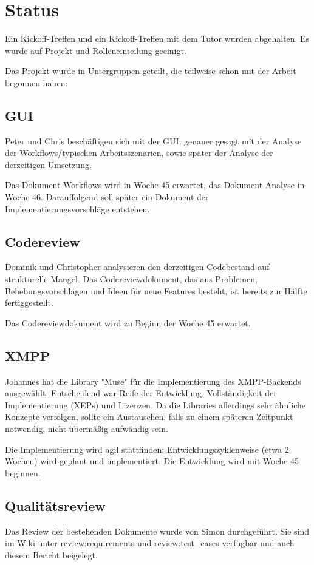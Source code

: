 \setcounter{chapter}{1}
\section{Status}
Ein Kickoff-Treffen und ein Kickoff-Treffen mit dem Tutor wurden abgehalten.
Es wurde auf Projekt und Rolleneinteilung geeinigt.

Das Projekt wurde in Untergruppen geteilt, die teilweise schon mit der Arbeit
begonnen haben:

\subsection{GUI}
Peter und Chris beschäftigen sich mit der GUI, genauer gesagt mit der Analyse
der Workflows/typischen Arbeitsszenarien, sowie später der Analyse der
derzeitigen Umsetzung.

Das Dokument Workflows wird in Woche 45 erwartet, das Dokument Analyse in
Woche 46. Darauffolgend soll später ein Dokument der Implementierungsvorschläge
 entstehen.

\subsection{Codereview}
Dominik und Christopher analysieren den derzeitigen Codebestand auf
strukturelle Mängel. Das Codereviewdokument, das aus Problemen,
Behebungsvorschlägen und Ideen für neue Features besteht, ist bereits zur Hälfte
fertiggestellt.

Das Codereviewdokument wird zu Beginn der Woche 45 erwartet.

\subsection{XMPP}
Johannes hat die Library "Muse" für die Implementierung des XMPP-Backends
ausgewählt. Entscheidend war Reife der Entwicklung, Vollständigkeit der
Implementierung (XEPs) und Lizenzen. Da die Libraries allerdings sehr ähnliche
Konzepte verfolgen, sollte ein Austauschen, falls zu einem späteren Zeitpunkt
notwendig, nicht übermäßig aufwändig sein.

Die Implementierung wird agil stattfinden: Entwicklungszyklenweise (etwa 2
Wochen) wird geplant und implementiert. Die Entwicklung wird mit Woche 45
beginnen.

\subsection{Qualitätsreview}
Das Review der bestehenden Dokumente wurde von Simon durchgeführt. Sie sind im
Wiki unter review:requirements und review:test\_cases verfügbar und auch diesem
Bericht beigelegt.

